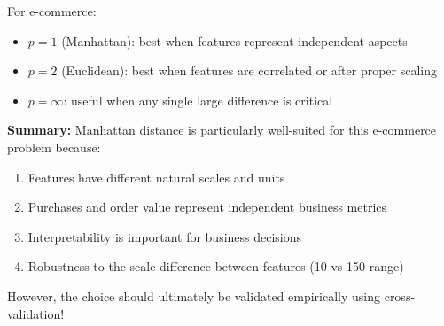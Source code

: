 \documentclass[12pt]{article}
\begin{document}
\begin{explanation}
For e-commerce:
\begin{itemize}
    \item \(p=1\) (Manhattan): best when features represent independent aspects
    \item \(p=2\) (Euclidean): best when features are correlated or after proper scaling
    \item \(p=\infty\): useful when any single large difference is critical
\end{itemize}

\textbf{Summary:} Manhattan distance is particularly well-suited for this e-commerce problem because:
\begin{enumerate}
    \item Features have different natural scales and units
    \item Purchases and order value represent independent business metrics
    \item Interpretability is important for business decisions
    \item Robustness to the scale difference between features (10 vs 150 range)
\end{enumerate}

However, the choice should ultimately be validated empirically using cross-validation!
\end{explanation}
\end{document}
